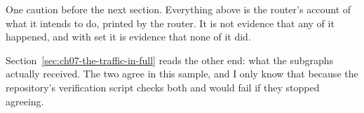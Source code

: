 One caution before the next section. Everything above is the router's account of
what it intends to do, printed by the router. It is not evidence that any of it
happened, and with  set it is evidence that none of it
did.

Section~\ref{sec:ch07-the-traffic-in-full} reads the other end: what the
subgraphs actually received. The two agree in this sample, and I only know that
because the repository's verification script checks both and would fail if they
stopped agreeing.

%
